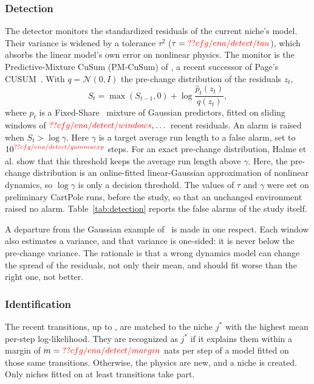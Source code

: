 \subsubsection{Detection}
The detector monitors the standardized residuals of the current niche's model. Their variance is widened by a tolerance $\tau^2$ ($\tau = \Res{cfg/ena/detect/tau}$), which absorbs the linear model's own error on nonlinear physics. The monitor is the Predictive-Mixture CuSum (PM-CuSum) of \citet*{halme2026sequential}, a recent successor of Page's CUSUM~\citep{page1954continuous}. With $q = \mathcal{N}(0, I)$ the pre-change distribution of the residuals $z_t$,
\begin{equation}
S_t = \max(S_{t-1}, 0) + \log \frac{\hat{p}_t(z_t)}{q(z_t)},
\end{equation}
where $\hat{p}_t$ is a Fixed-Share~\citep{herbster1998tracking} mixture of Gaussian predictors, fitted on sliding windows of $\Res{cfg/ena/detect/windows}, \dots$ recent residuals. An alarm is raised when $S_t > \log\gamma$. Here $\gamma$ is a target average run length to a false alarm, set to $10^{\Res{cfg/ena/detect/gammaexp}}$ steps. For an exact pre-change distribution, Halme et al. show that this threshold keeps the average run length above $\gamma$. Here, the pre-change distribution is an online-fitted linear-Gaussian approximation of nonlinear dynamics, so $\log\gamma$ is only a decision threshold. The values of $\tau$ and $\gamma$ were set on preliminary CartPole runs, before the study, so that an unchanged environment raised no alarm. Table~\ref{tab:detection} reports the false alarms of the study itself.

A departure from the Gaussian example of~\citep{halme2026sequential} is made in one respect. Each window also estimates a variance, and that variance is one-sided: it is never below the pre-change variance. The rationale is that a wrong dynamics model can change the spread of the residuals, not only their mean, and should fit worse than the right one, not better.

\subsubsection{Identification}
The recent transitions, up to , are matched to the niche $j^{*}$ with the highest mean per-step log-likelihood. They are recognized as $j^{*}$ if it explains them within a margin of $m = \Res{cfg/ena/detect/margin}$ nats per step of a model fitted on those same transitions. Otherwise, the physics are new, and a niche is created. Only niches fitted on at least  transitions take part.

